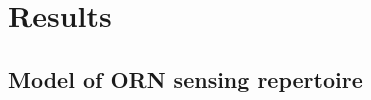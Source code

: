 \documentclass[9pt,twocolumn,twoside,lineno]{pnas-new}
\begin{document}
\section{Results}






\subsection{Model of ORN sensing repertoire}



\end{document}
